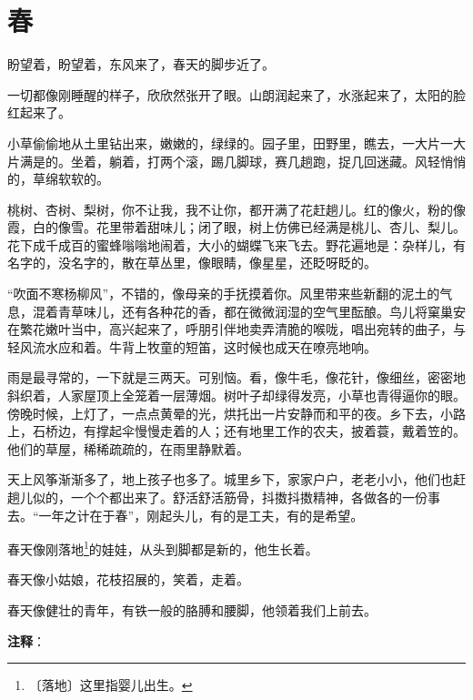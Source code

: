 \documentclass[12pt,UTF-8,openany]{ctexbook}
\begin{document}
\chapter{春}

\begin{large}
    
    盼望着，盼望着，东风来了，春天的脚步近了。
    
    一切都像刚睡醒的样子，欣欣然张开了眼。山朗润起来了，水涨起来了，太阳的脸红起来了。
    
    小草偷偷地从土里钻出来，嫩嫩的，绿绿的。园子里，田野里，瞧去，一大片一大片满是的。坐着，躺着，打两个滚，踢几脚球，赛几趟跑，捉几回迷藏。风轻悄悄的，草绵软软的。
    
    桃树、杏树、梨树，你不让我，我不让你，都开满了花赶趟儿。红的像火，粉的像霞，白的像雪。花里带着甜味儿；闭了眼，树上仿佛已经满是桃儿、杏儿、梨儿。花下成千成百的蜜蜂嗡嗡地闹着，大小的蝴蝶飞来飞去。野花遍地是：杂样儿，有名字的，没名字的，散在草丛里，像眼睛，像星星，还眨呀眨的。
    
    “吹面不寒杨柳风”，不错的，像母亲的手抚摸着你。风里带来些新翻的泥土的气息，混着青草味儿，还有各种花的香，都在微微润湿的空气里酝酿。鸟儿将窠巢安在繁花嫩叶当中，高兴起来了，呼朋引伴地卖弄清脆的喉咙，唱出宛转的曲子，与轻风流水应和着。牛背上牧童的短笛，这时候也成天在嘹亮地响。
    
    雨是最寻常的，一下就是三两天。可别恼。看，像牛毛，像花针，像细丝，密密地斜织着，人家屋顶上全笼着一层薄烟。树叶子却绿得发亮，小草也青得逼你的眼。傍晚时候，上灯了，一点点黄晕的光，烘托出一片安静而和平的夜。乡下去，小路上，石桥边，有撑起伞慢慢走着的人；还有地里工作的农夫，披着蓑，戴着笠的。他们的草屋，稀稀疏疏的，在雨里静默着。
    
    天上风筝渐渐多了，地上孩子也多了。城里乡下，家家户户，老老小小，他们也赶趟儿似的，一个个都出来了。舒活舒活筋骨，抖擞抖擞精神，各做各的一份事去。“一年之计在于春”，刚起头儿，有的是工夫，有的是希望。
    
    春天像刚落地\footnote{〔落地〕这里指婴儿出生。}的娃娃，从头到脚都是新的，他生长着。
    
    春天像小姑娘，花枝招展的，笑着，走着。
    
    春天像健壮的青年，有铁一般的胳膊和腰脚，他领着我们上前去。
    
\end{large}


\newpage

\textbf{注释}：

\vspace{-1em}
\end{document}
